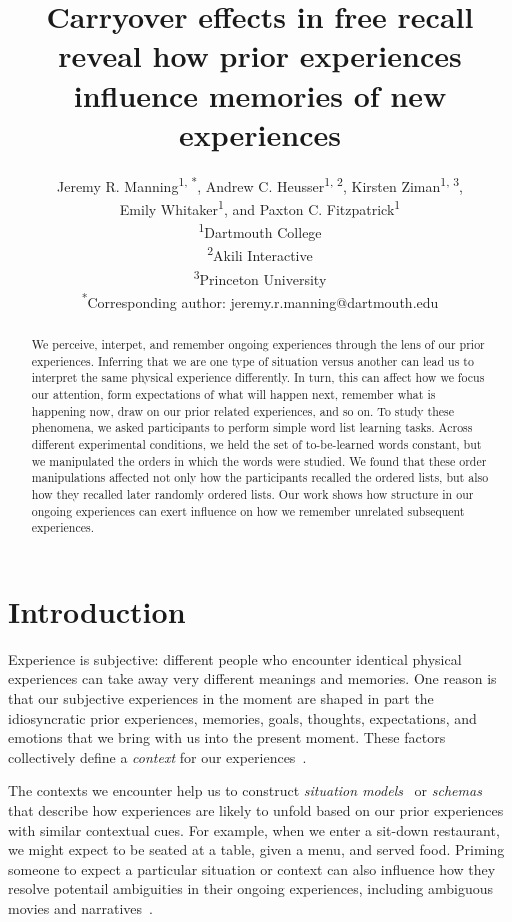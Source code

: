 \documentclass[10pt]{article}
\title{Carryover effects in free recall reveal how prior experiences influence memories of new experiences}
\author{Jeremy R. Manning\textsuperscript{1, *}, Andrew C. Heusser\textsuperscript{1, 2}, Kirsten Ziman\textsuperscript{1, 3},\\Emily Whitaker\textsuperscript{1}, and Paxton C. Fitzpatrick\textsuperscript{1}\\\textsuperscript{1}Dartmouth College\\\textsuperscript{2}Akili Interactive\\\textsuperscript{3}Princeton University\\\textsuperscript{*}Corresponding author: jeremy.r.manning@dartmouth.edu}
\date{}
\begin{document}
\maketitle

\begin{abstract}
We perceive, interpet, and remember ongoing experiences through the lens of our prior experiences.
Inferring that we are one type of situation versus another can lead us to interpret the same physical
experience differently.  In turn, this can affect how we focus our attention, form expectations of what will happen next, 
remember what is happening now, draw on our prior related experiences, and so on.  To study these phenomena,
we asked participants to perform simple word list learning tasks.  Across different experimental conditions, we held the set of
to-be-learned words constant, but we manipulated the orders in which the words were studied.  We found that 
these order manipulations affected not only how the participants recalled the ordered lists, but also how they recalled later randomly
ordered lists.  Our work shows how structure in our ongoing experiences can exert influence on how we remember unrelated
subsequent experiences.
\end{abstract}


\section*{Introduction}

Experience is subjective: different people who encounter identical physical experiences
can take away very different meanings and memories.  One reason is that our subjective
experiences in the moment are shaped in part the idiosyncratic prior experiences, memories,
goals, thoughts, expectations, and emotions that we bring with us into the present moment.
These factors collectively define a \textit{context} for our experiences~\citep{Mann20}.

The contexts we encounter help us to construct \textit{situation models}~\citep{RangRitc12, MannEtal15}
or \textit{schemas}~\citep{MasiEtal22, BaldEtal18} that describe how experiences are likely to unfold
based on our prior experiences with similar contextual cues.  For example, when we enter a sit-down restaurant,
we might expect to be seated at a table, given a menu, and served food.  Priming someone
to expect a particular situation or context can also influence how they resolve potentail ambiguities
in their ongoing experiences, including ambiguous movies and narratives~\citep{YeshEtal17}.
\end{document}
